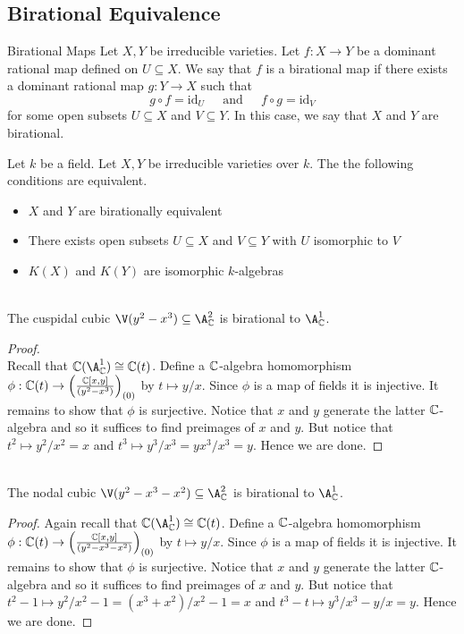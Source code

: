 \documentclass[a4paper]{article}
\begin{document}
\subsection{Birational Equivalence}
\begin{defn}{Birational Maps}{} Let $X,Y$ be irreducible varieties. Let $f:X\to Y$ be a dominant rational map defined on $U\subseteq X$. We say that $f$ is a birational map if there exists a dominant rational map $g:Y\to X$ such that $$g\circ f=\text{id}_U\;\;\;\;\text{ and }\;\;\;\;f\circ g=\text{id}_V$$ for some open subsets $U\subseteq X$ and $V\subseteq Y$. In this case, we say that $X$ and $Y$ are birational. 
\end{defn}

\begin{prp}{}{} Let $k$ be a field. Let $X,Y$ be irreducible varieties over $k$. The the following conditions are equivalent. 
\begin{itemize}
\item $X$ and $Y$ are birationally equivalent
\item There exists open subsets $U\subseteq X$ and $V\subseteq Y$ with $U$ isomorphic to $V$
\item $K(X)$ and $K(Y)$ are isomorphic $k$-algebras
\end{itemize}
\end{prp}

\begin{eg}{}{}\\
The cuspidal cubic $\V(y^2-x^3)\subseteq\A_\C^2$ is birational to $\A_\C^1$. 
\begin{proof}\\
Recall that $\C(\A_\C^1)\cong\C(t)$. Define a $\mathbb{C}$-algebra homomorphism $\phi:\mathbb{C}(t)\to\left(\frac{\mathbb{C}[x,y]}{(y^2-x^3)}\right)_{(0)}$ by $t\mapsto y/x$. Since $\phi$ is a map of fields it is injective. It remains to show that $\phi$ is surjective. Notice that $x$ and $y$ generate the latter $\mathbb{C}$-algebra and so it suffices to find preimages of $x$ and $y$. But notice that $t^2\mapsto y^2/x^2=x$ and $t^3\mapsto y^3/x^3=yx^3/x^3=y$. Hence we are done. 
\end{proof}
\end{eg}

\begin{eg}{}{}\\
The nodal cubic $\V(y^2-x^3-x^2)\subseteq\A_\C^2$ is birational to $\A_\C^1$. 
\begin{proof}
Again recall that $\C(\A_\C^1)\cong\C(t)$. Define a $\mathbb{C}$-algebra homomorphism $\phi:\mathbb{C}(t)\to\left(\frac{\mathbb{C}[x,y]}{(y^2-x^3-x^2)}\right)_{(0)}$ by $t\mapsto y/x$. Since $\phi$ is a map of fields it is injective. It remains to show that $\phi$ is surjective. Notice that $x$ and $y$ generate the latter $\mathbb{C}$-algebra and so it suffices to find preimages of $x$ and $y$. But notice that $t^2-1\mapsto y^2/x^2-1=(x^3+x^2)/x^2-1=x$ and $t^3-t\mapsto y^3/x^3-y/x=y$. Hence we are done. 
\end{proof}
\end{eg}
\end{document}
